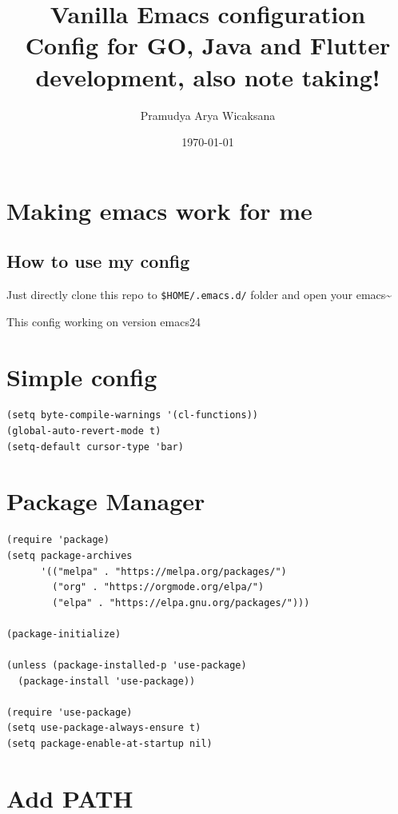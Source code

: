 \documentclass[11pt]{article}
\author{Pramudya Arya Wicaksana}
\date{\today}
\title{Vanilla Emacs configuration\\\medskip
\large Config for GO, Java and Flutter development, also note taking!}
\begin{document}
\maketitle
\tableofcontents


\section{Making emacs work for me}
\label{sec:org1f361df}

\subsection{How to use my config}
\label{sec:org4ff7f2d}

Just directly clone this repo to \texttt{\$HOME/.emacs.d/} folder and open your emacs\textasciitilde{}

This config working on version emacs24

\section{Simple config}
\label{sec:orgc2a5726}

\begin{verbatim}
(setq byte-compile-warnings '(cl-functions))
(global-auto-revert-mode t)
(setq-default cursor-type 'bar) 

\end{verbatim}

\section{Package Manager}
\label{sec:org4cd8560}
\begin{verbatim}
(require 'package)
(setq package-archives
      '(("melpa" . "https://melpa.org/packages/")
        ("org" . "https://orgmode.org/elpa/")
        ("elpa" . "https://elpa.gnu.org/packages/")))

(package-initialize)

(unless (package-installed-p 'use-package)
  (package-install 'use-package))

(require 'use-package)
(setq use-package-always-ensure t)
(setq package-enable-at-startup nil)
\end{verbatim}

\section{Add PATH}
\label{sec:org0b2388b}
\end{document}
